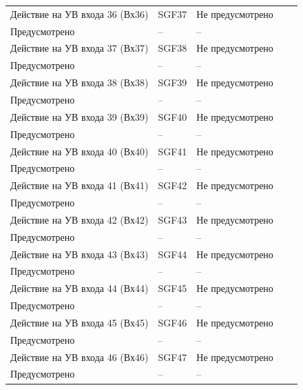 \begin{longtable}{|>{\centering\arraybackslash}m{5.3cm}|>{\centering\arraybackslash}m{3.3cm}|>{\centering\arraybackslash}m{4.2cm}|>{\centering\arraybackslash}m{1.8cm}|>{\centering\arraybackslash}m{1cm}|}
\hline
\centering Действие на УВ входа 36 (Вх36)  & \centering SGF37 & \centering Не предусмотрено \\ Предусмотрено & \centering -- & \centering \arraybackslash -- \\
\hline
\centering Действие на УВ входа 37 (Вх37)  & \centering SGF38 & \centering Не предусмотрено \\ Предусмотрено & \centering -- & \centering \arraybackslash -- \\
\hline
\centering Действие на УВ входа 38 (Вх38)  & \centering SGF39 & \centering Не предусмотрено \\ Предусмотрено & \centering -- & \centering \arraybackslash -- \\
\hline
\centering Действие на УВ входа 39 (Вх39)  & \centering SGF40 & \centering Не предусмотрено \\ Предусмотрено & \centering -- & \centering \arraybackslash -- \\
\hline
\centering Действие на УВ входа 40 (Вх40)  & \centering SGF41 & \centering Не предусмотрено \\ Предусмотрено & \centering -- & \centering \arraybackslash -- \\
\hline
\centering Действие на УВ входа 41 (Вх41)  & \centering SGF42 & \centering Не предусмотрено \\ Предусмотрено & \centering -- & \centering \arraybackslash -- \\
\hline
\centering Действие на УВ входа 42 (Вх42)  & \centering SGF43 & \centering Не предусмотрено \\ Предусмотрено & \centering -- & \centering \arraybackslash -- \\
\hline
\centering Действие на УВ входа 43 (Вх43)  & \centering SGF44 & \centering Не предусмотрено \\ Предусмотрено & \centering -- & \centering \arraybackslash -- \\
\hline
\centering Действие на УВ входа 44 (Вх44)  & \centering SGF45 & \centering Не предусмотрено \\ Предусмотрено & \centering -- & \centering \arraybackslash -- \\
\hline
\centering Действие на УВ входа 45 (Вх45)  & \centering SGF46 & \centering Не предусмотрено \\ Предусмотрено & \centering -- & \centering \arraybackslash -- \\
\hline
\centering Действие на УВ входа 46 (Вх46)  & \centering SGF47 & \centering Не предусмотрено \\ Предусмотрено & \centering -- & \centering \arraybackslash -- \\

\end{longtable}
